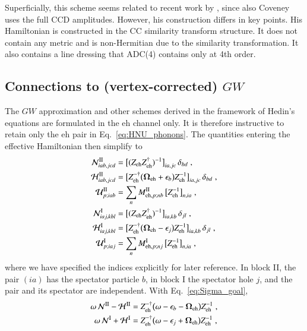 \documentclass[aip,jcp,reprint,noshowkeys,superscriptaddress]{revtex4-1}
\newcommand{\eps}{\epsilon}
\newcommand{\eh}{\text{eh}}
\begin{document}
Superficially, this scheme seems related to recent work by \citet{Coveney2025}, 
since also Coveney\cite{Coveney2025} uses the full CCD amplitudes. However, 
his construction differs in key points.
His Hamiltonian is constructed in the CC similarity transform structure.
It does not contain any metric and is non-Hermitian due to the similarity transformation.
It also contains a line dressing that ADC(4) contains
only at 4th order.

\subsection{Connections to (vertex-corrected) \texorpdfstring{$GW$}{GW}}
The $GW$ approximation and other schemes derived in the framework of
Hedin's equations\cite{Hedin1965} are formulated in the $\eh$ channel only.
It is therefore instructive to retain only the $\eh$ pair in
Eq.~\eqref{eq:HNU_phonons}. The quantities entering the 
effective Hamiltonian then simplify to  
\begin{equation}
	\label{eq:GW_phonon_HNU}
\begin{aligned}
\mathcal N^{\rm II}_{iab,jcd}
&=
\big[(Z_{\eh}Z_{\eh}^\dagger)^{-1}\big]_{ia,jc}\,\delta_{bd} \;,
\\
\mathcal H^{\rm II}_{iab,jcd}
&=
\big[Z_{\eh}^{-\dagger}\big(\boldsymbol\Omega_{\eh}+\eps_b\big)Z_{\eh}^{-1}\big]_{ia,jc}\,\delta_{bd} \;,
\\
\mathcal U^{\rm II}_{p;iab}
&=
\sum_n M^{\rm II}_{\eh,p;nb}\,\big[Z_{\eh}^{-1}\big]_{n,ia} \;,
\\
\mathcal N^{\rm I}_{iaj,kbl}
&=
\big[(Z_{\eh}Z_{\eh}^\dagger)^{-1}\big]_{ia,kb}\,\delta_{jl} \;,
\\
\mathcal H^{\rm I}_{iaj,kbl}
&=
\big[Z_{\eh}^{-\dagger}\big(\boldsymbol\Omega_{\eh}-\eps_j\big)Z_{\eh}^{-1}\big]_{ia,kb}\,\delta_{jl} \;,
\\
\mathcal U^{\rm I}_{p;iaj}
&=
\sum_n M^{\rm I}_{\eh,p;nj}\,\big[Z_{\eh}^{-1}\big]_{n,ia} \;,
\end{aligned}
\end{equation}
where we have specified the indices explicitly for later reference. In
block II, the pair $(ia)$ has the spectator particle $b$, in block I
the spectator hole $j$, and the pair and its spectator are independent.
With Eq.~\eqref{eq:Sigma_goal},
\begin{equation}
\begin{aligned}
\omega\,\mathcal N^{\rm II}-\mathcal H^{\rm II}
&=
Z_{\eh}^{-\dagger}\big(\omega-\eps_b-\boldsymbol\Omega_{\eh}\big)Z_{\eh}^{-1} \;,
\\
\omega\,\mathcal N^{\rm I}+\mathcal H^{\rm I}
&=
Z_{\eh}^{-\dagger}\big(\omega-\eps_j+\boldsymbol\Omega_{\eh}\big)Z_{\eh}^{-1} \;,
\end{aligned}
\nonumber
\end{equation}
\end{document}

